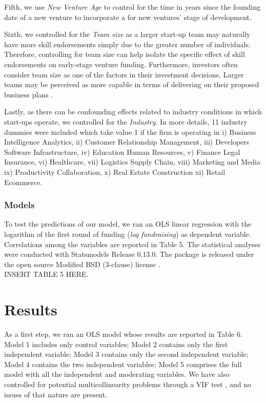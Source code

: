 \documentclass[12pt]{article}
\begin{document}
Fifth, we use \textit{New Venture Age} to control for the time in years since the founding date of a new venture to incorporate a for new ventures' stage of development.

Sixth, we controlled for the \textit{Team size} as a larger start-up team may naturally have more skill endorsements simply due to the greater number of individuals. Therefore, controlling for team size can help isolate the specific effect of skill endorsements on early-stage venture funding. Furthermore, investors often consider team size as one of the factors in their investment decisions. Larger teams may be perceived as more capable in terms of delivering on their proposed business plans \citep{harrison2007s, williamsky1998demographyand}.

Lastly, as there can be confounding effects related to industry conditions in which start-ups operate, we controlled for the \textit{Industry}. In more details, 11 industry dummies were included which take value 1 if the firm is operating in i) Business Intelligence Analytics, ii) Customer Relationship Management, iii) Developers Software Infrastructure, iv) Education Human Resources, v) Finance Legal Insurance, vi) Healthcare, vii) Logistics Supply Chain, viii) Marketing and Media ix) Productivity Collaboration, x) Real Estate Construction xi) Retail Ecommerce.

\subsubsection{Models}

To test the predictions of our model, we ran an OLS linear regression with the logarithm of the first round of funding (\textit{log fundraising}) as dependent variable. Correlations among the variables are reported in Table 5\label{table5}. The statistical analyses were conducted with Statsmodels Release 0.13.0. The package is released under the open source Modified BSD (3-clause) license \citep{seabold2010statsmodels}. \\

INSERT TABLE 5 HERE.

\section{Results}

As a first step, we ran an OLS model whose results are reported in Table 6\label{table6}. Model 1 includes only control variables; Model 2 contains only the first independent variable; Model 3 contains only the second independent variable; Model 4 contains the two independent variables; Model 5 comprises the full model with all the independent and moderating variables. We have also controlled for potential multicollinearity problems through a VIF test \citep{james2013introduction}, and no issues of that nature are present. \\
\end{document}

